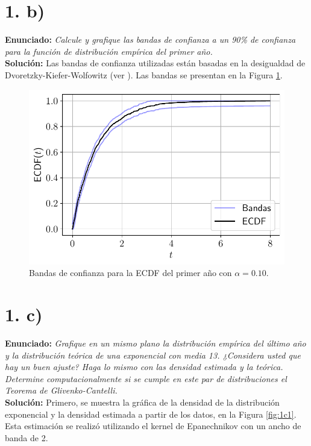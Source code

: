 \documentclass[fleqn]{article}
\begin{document}
\section*{1. b)}
\textbf{Enunciado:} \textit{Calcule y grafique las bandas de confianza a un 90\% de confianza para la función de distribución empírica del primer año.}\\
\textbf{Solución:} Las bandas de confianza utilizadas están basadas en la desigualdad de Dvoretzky-Kiefer-Wolfowitz (ver \cite[p. 14]{wasserman2006}). Las bandas se presentan en la Figura \ref{fig:1b}.
\begin{figure}[H]
    \centering
    \includegraphics[scale=.6]{1b.pdf}
    \caption{Bandas de confianza para la ECDF del primer año con $\alpha=0.10$.}
    \label{fig:1b}
\end{figure}

\section*{1. c)}
\textbf{Enunciado:} \textit{Grafique en un mismo plano la distribución empírica del último año y la distribución teórica de una exponencial con media 13. ¿Considera usted que hay un buen ajuste? Haga lo mismo con las densidad estimada y la teórica. Determine computacionalmente si se cumple en este par de distribuciones el Teorema de Glivenko-Cantelli.}\\
\textbf{Solución:} Primero, se muestra la gráfica de la densidad de la distribución exponencial y la densidad estimada a partir de los datos, en la Figura \ref{fig:1c1}. Esta estimación se realizó utilizando el kernel de Epanechnikov con un ancho de banda de 2.
\end{document}
